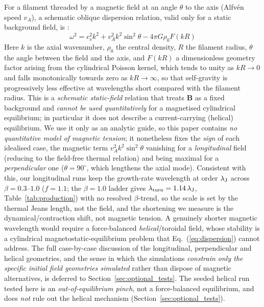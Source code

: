 \documentclass[usenatbib,twoside,twocolumn]{mnras}
\begin{document}
For a filament threaded by a magnetic field at an angle $\theta$ to the axis (Alfv\'en speed $v_A$), a schematic oblique dispersion relation, valid only for a static background field, is \citep{Nakamura1993}:
\begin{equation}
\omega^2 = c_s^2 k^2 + v_A^2 k^2 \sin^2\theta - 4\pi G\rho_0 F(kR)
\label{eq:dispersion}
\end{equation}
Here $k$ is the axial wavenumber, $\rho_0$ the central density, $R$ the filament radius, $\theta$ the angle between the field and the axis, and $F(kR)$ a dimensionless geometry factor arising from the cylindrical Poisson kernel, which tends to unity as $kR\to0$ and falls monotonically towards zero as $kR\to\infty$, so that self-gravity is progressively less effective at wavelengths short compared with the filament radius. This is a \emph{schematic static-field} relation that treats $\mathbf{B}$ as a fixed background and \emph{cannot be used quantitatively} for a magnetised cylindrical equilibrium; in particular it does not describe a current-carrying (helical) equilibrium. We use it only as an analytic guide, so this paper contains \emph{no quantitative model of magnetic tension}; it nonetheless fixes the \emph{sign} of each idealised case, the magnetic term $v_A^2k^2\sin^2\theta$ vanishing for a \emph{longitudinal} field (reducing to the field-free thermal relation) and being maximal for a \emph{perpendicular} one ($\theta=90^\circ$, which lengthens the axial mode). Consistent with this, our longitudinal runs keep the growth-rate wavelength at order $\lambda_{\rm J}$ across $\beta=0.3$--$1.0$ ($f=1.1$; the $\beta=1.0$ ladder gives $\lambda_{\rm turn}=1.14\,\lambda_{\rm J}$, Table~\ref{tab:production}) with no resolved $\beta$-trend, so the scale is set by the thermal Jeans length, not the field, and the shortening we measure is the dynamical/contraction shift, not magnetic tension. A genuinely shorter magnetic wavelength would require a force-balanced \emph{helical}/toroidal field, whose stability is a cylindrical magnetostatic-equilibrium problem that Eq.~(\ref{eq:dispersion}) cannot address. The full case-by-case discussion of the longitudinal, perpendicular and helical geometries, and the sense in which the simulations \emph{constrain only the specific initial field geometries simulated} rather than dispose of magnetic alternatives, is deferred to Section~\ref{sec:optional_tests}. The seeded helical run tested here is an \emph{out-of-equilibrium pinch}, not a force-balanced equilibrium, and does \emph{not} rule out the helical mechanism (Section~\ref{sec:optional_tests}).
\end{document}
